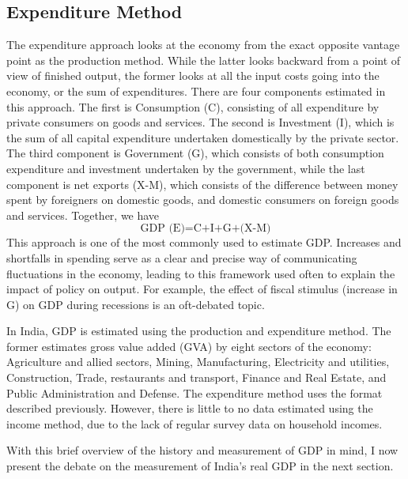 \documentclass[12pt,nobind, a4paper]{reedthesis}
\begin{document}
 \hypertarget{expenditure-method}{%
 \subsection{Expenditure Method}\label{expenditure-method}}

 The expenditure approach looks at the economy from the exact opposite vantage point as the production method. While the latter looks backward from a point of view of finished output, the former looks at all the input costs going into the economy, or the sum of expenditures. There are four components estimated in this approach. The first is Consumption (C), consisting of all expenditure by private consumers on goods and services. The second is Investment (I), which is the sum of all capital expenditure undertaken domestically by the private sector. The third component is Government (G), which consists of both consumption expenditure and investment undertaken by the government, while the last component is net exports (X-M), which consists of the difference between money spent by foreigners on domestic goods, and domestic consumers on foreign goods and services. Together, we have
 \begin{equation}
 \text{GDP (E)}=\text{C+I+G+(X-M)}
 \end{equation}
 This approach is one of the most commonly used to estimate GDP. Increases and shortfalls in spending serve as a clear and precise way of communicating fluctuations in the economy, leading to this framework used often to explain the impact of policy on output. For example, the effect of fiscal stimulus (increase in G) on GDP during recessions is an oft-debated topic.
 \linebreak

 In India, GDP is estimated using the production and expenditure method. The former estimates gross value added (GVA) by eight sectors of the economy: Agriculture and allied sectors, Mining, Manufacturing, Electricity and utilities, Construction, Trade, restaurants and transport, Finance and Real Estate, and Public Administration and Defense. The expenditure method uses the format described previously. However, there is little to no data estimated using the income method, due to the lack of regular survey data on household incomes.
 \linebreak

 With this brief overview of the history and measurement of GDP in mind, I now present the debate on the measurement of India's real GDP in the next section.
\end{document}
